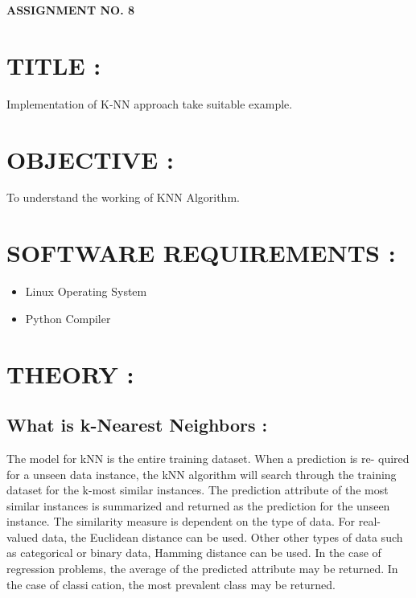 \documentclass{article}
\begin{document}
	
	\begin{center}
		\textbf{\bfseries\Large ASSIGNMENT NO. 8}
		\\[1cm]
	\end{center}
	\section{TITLE : } Implementation of K-NN approach take suitable example.
	\section{OBJECTIVE : }  To understand the working of KNN Algorithm.
	\section{SOFTWARE REQUIREMENTS : }
	\begin{itemize}
		\item Linux Operating System
		\item Python Compiler
	\end{itemize}
	
	\section{THEORY : }
	\subsection{What is k-Nearest Neighbors :}
	The model for kNN is the entire training dataset. When a prediction is re-
	quired for a unseen data instance, the kNN algorithm will search through the
	training dataset for the k-most similar instances. The prediction attribute
	of the most similar instances is summarized and returned as the prediction
	for the unseen instance.
	The similarity measure is dependent on the type of data. For real-valued
	data, the Euclidean distance can be used. Other other types of data such as
	categorical or binary data, Hamming distance can be used.
	In the case of regression problems, the average of the predicted attribute
	may be returned. In the case of classication, the most prevalent class may
	be returned. 
\end{document}
